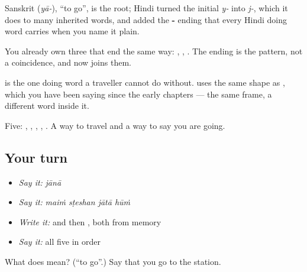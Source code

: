 Sanskrit  (\emph{yā-}), \textquotedblleft{}to go\textquotedblright{}, is the root; Hindi turned the initial \emph{y-} into \emph{j-}, which it does to many inherited words, and added the \textbf{-} ending that every Hindi doing word carries when you name it plain.

You already own three that end the same way: \textbf{}, \textbf{}, \textbf{}. The ending is the pattern, not a coincidence, and  now joins them.

 is the one doing word a traveller cannot do without. \textbf{   } uses the same shape as \textbf{   }, which you have been saying since the early chapters — the same frame, a different word inside it.

\begin{grammarlens}[title={What you've built}]
Five: , , , , . A way to travel and a way to say you are going.
\end{grammarlens}

\subsection*{Your turn}
\begin{itemize}
\raggedright
  \item \emph{Say it:} \emph{jānā}
  \item \emph{Say it:} \emph{maiṁ sṭeshan jātā hūṁ}
  \item \emph{Write it:}  and then , both from memory
  \item \emph{Say it:} all five in order
\end{itemize}

\begin{tcolorbox}[breakable,colback=teal!4,colframe=teal!35!black,title={Before you move on}]
What does  mean? (\textquotedblleft{}to go\textquotedblright{}.) Say that you go to the station.
\end{tcolorbox}
